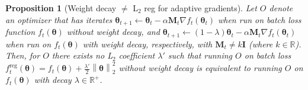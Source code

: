 \documentclass[usenames,dvipsnames]{article} %
\newcommand{\norm}[1]{\left\lVert#1\right\rVert}
\newtheorem{prop}{Proposition}
\newcommand{\note}[1]{
	\noindent~\\
	\vspace{0.25cm}
	\fcolorbox{red}{yellow}{\parbox{0.97\textwidth}{#1\\}}
	\vspace{0.25cm}
}
\begin{document}
\begin{prop}[Weight decay $\neq$ L$_2$ reg for adaptive gradients] Let $O$ denote an optimizer that has iterates $\bm{\theta}_{t+1} \leftarrow \bm{\theta}_t - \alpha \mathbf{M}_t \nabla f_t(\bm{\theta}_t)$ when run on batch loss function $f_t(\bm{\theta})$ \emph{without} weight decay, and 
$\bm{\theta}_{t+1} \leftarrow (1 - \lambda) \bm{\theta}_t - \alpha \mathbf{M}_t \nabla f_t(\bm{\theta}_t)$ when run on $f_t(\bm{\theta})$ \emph{with} weight decay, respectively, with $\mathbf{M}_t \neq k \mathbf{I}$ (where $k\in\mathbb{R}$). 
%
Then, for $O$ there exists no L$_2$ coefficient $\lambda'$ such that running $O$ on batch loss $f^{\text{reg}}_t(\bm{\theta}) = f_t(\bm{\theta}) + \frac{\lambda'}{2} \norm{\bm{\theta}}_2^2$ without weight decay is equivalent to running $O$ on $f_t(\bm{\theta})$ with decay $\lambda\in\mathbb{R}^+$. 
\end{prop}

\end{document}
